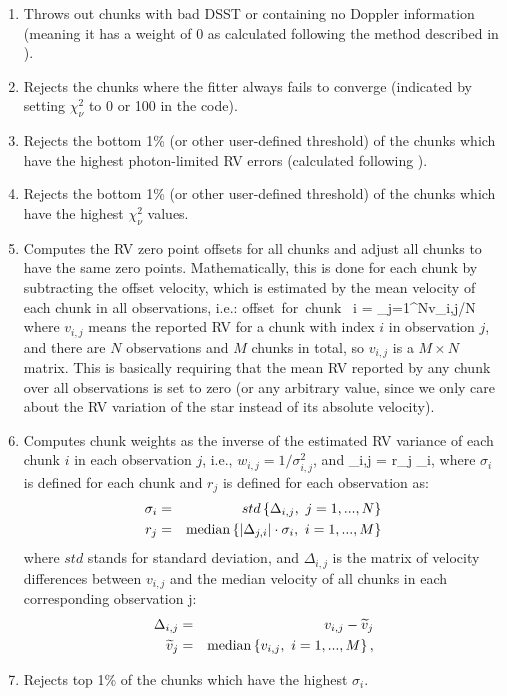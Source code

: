 \begin{enumerate}
\item Throws out chunks with bad DSST or containing no Doppler
  information (meaning it has a weight of 0 as calculated following
  the method described in \citealt{butler1996}).
\item Rejects the chunks where the fitter always fails to converge
  (indicated by setting $\chi_\nu^2$ to 0 or 100 in the code).  
\item Rejects the bottom 1\% (or other user-defined threshold) of the
  chunks which have the highest photon-limited RV errors (calculated
  following \citealt{butler1996}).
\item Rejects the bottom 1\% (or other user-defined threshold) of the
  chunks which have the highest $\chi_\nu^2$ values.
\item Computes the RV zero point offsets for all chunks and adjust all
  chunks to have the same zero points. Mathematically, this is done
  for each chunk by subtracting the offset velocity, which is
  estimated by the mean velocity of each chunk in all observations,
  i.e.:
  \beq
  {\rm offset\ for\ chunk\ } i = \sum_{j=1}^{N}{v_{i,j}}/N
  \eeq
  where $v_{i,j}$ means the reported RV for a chunk with
  index $i$ in observation $j$, and there are $N$
  observations and $M$ chunks in total, so $v_{i,j}$ is a
  $M \times N$ matrix. This is basically requiring that the mean RV
  reported by any chunk over all observations is set to zero (or any
  arbitrary value, since we only care about the RV variation of the
  star instead of its absolute velocity).
\item Computes chunk weights as the inverse of the estimated RV
  variance of each chunk $i$ in each observation $j$, i.e.,
  $w_{i,j} = 1/\sigma_{i,j}^2$, and 
  \beq
  \sigma_{i,j} = r_j \cdot \sigma_i,
  \eeq
  where $\sigma_i$ is defined for each chunk and $r_j$ is defined for
  each observation as:
  \begin{eqnarray}
  \sigma_i &=& std\left\{  \Delta_{i,j},\ j=1,...,N  \right\}\\
  r_j &=& {\rm median}\left\{   |\Delta_{j,i}| \cdot \sigma_i,\  i=1,...,M
  \right\}
  \end{eqnarray}
  where $std$ stands for standard deviation, and $\Delta_{i,j}$ is the
  matrix of velocity differences between $v_{i,j}$ and the median
  velocity of all chunks in each corresponding observation j:
  \begin{eqnarray}
  \Delta_{i,j} &=& v_{i,j} - \widetilde{v}_j \\
  \widetilde{v}_j &=& {\rm median}\left\{  v_{i,j},\  i=1,...,M  \right\},
  \end{eqnarray}  
\item Rejects top 1\% of the chunks which have the highest $\sigma_i$.
\end{enumerate} 

